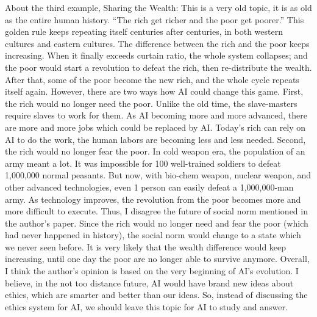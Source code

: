 \documentclass{article}
\begin{document}
\newline
\newline
About the third example, Sharing the Wealth: This is a very old topic, it is as old as the entire human history. “The rich get richer and the poor get poorer.” This golden rule keeps repeating itself centuries after centuries, in both western cultures and eastern cultures. The difference between the rich and the poor keeps increasing. When it finally exceeds curtain ratio, the whole system collapses; and the poor would start a revolution to defeat the rich, then re-distribute the wealth. After that, some of the poor become the new rich, and the whole cycle repeats itself again.
\newline
\newline
However, there are two ways how AI could change this game. First, the rich would no longer need the poor. Unlike the old time, the slave-masters require slaves to work for them. As AI becoming more and more advanced, there are more and more jobs which could be replaced by AI. Today’s rich can rely on AI to do the work, the human labors are becoming less and less needed. Second, the rich would no longer fear the poor. In cold weapon era, the population of an army meant a lot. It was impossible for 100 well-trained soldiers to defeat 1,000,000 normal peasants. But now, with bio-chem weapon, nuclear weapon, and other advanced technologies, even 1 person can easily defeat a 1,000,000-man army. As technology improves, the revolution from the poor becomes more and more difficult to execute.
\newline
\newline
Thus, I disagree the future of social norm mentioned in the author’s paper. Since the rich would no longer need and fear the poor (which had never happened in history), the social norm would change to a state which we never seen before. It is very likely that the wealth difference would keep increasing, until one day the poor are no longer able to survive anymore.
\newline
\newline
Overall, I think the author’s opinion is based on the very beginning of AI’s evolution. I believe, in the not too distance future, AI would have brand new ideas about ethics, which are smarter and better than our ideas. So, instead of discussing the ethics system for AI, we should leave this topic for AI to study and answer.

\newline
\end{document}
